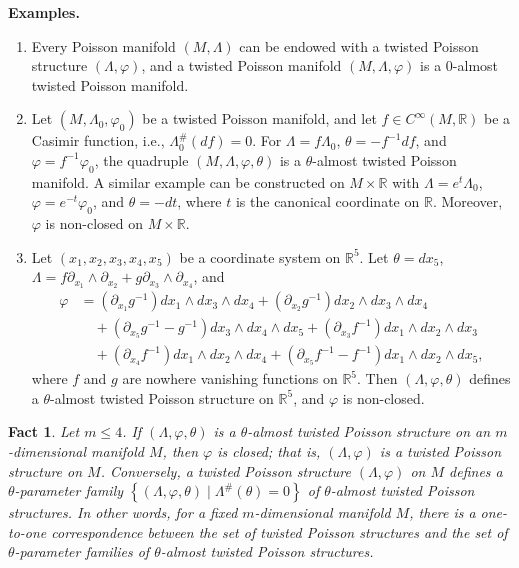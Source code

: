 \documentclass[a4paper,10pt]{article}
\numberwithin{equation}{section}
\theoremstyle{plain}
\newtheorem{fact}[theorem]{Fact}
\begin{document}
\noindent\textbf{Examples.}
\begin{enumerate}
	\item Every Poisson manifold $(M, \Lambda)$ can be endowed with a twisted Poisson structure $(\Lambda, \varphi)$, and a twisted Poisson manifold $(M, \Lambda, \varphi)$ is a $0$-almost twisted Poisson manifold.
	
	\item Let $(M, \Lambda_0, \varphi_0)$ be a twisted Poisson manifold, and let $f \in C^\infty(M, \mathbb{R})$ be a Casimir function, i.e., $\Lambda_0^{\#}(df) = 0$. For $\Lambda = f\Lambda_0$, $\theta = -f^{-1} df$, and $\varphi = f^{-1} \varphi_0$, the quadruple $(M, \Lambda, \varphi, \theta)$ is a $\theta$-almost twisted Poisson manifold. A similar example can be constructed on $M \times \mathbb{R}$ with $\Lambda = e^t \Lambda_0$, $\varphi = e^{-t} \varphi_0$, and $\theta = -dt$, where $t$ is the canonical coordinate on $\mathbb{R}$. Moreover, $\varphi$ is non-closed on $M \times \mathbb{R}$.
	
	\item \label{exem1.1.5} Let $(x_1, x_2, x_3, x_4, x_5)$ be a coordinate system on $\mathbb{R}^5$. Let $\theta = dx_5$, $\Lambda = f \partial_{x_1} \wedge \partial_{x_2} + g \partial_{x_3} \wedge \partial_{x_4}$, and
	\begin{align*}
		\varphi &= (\partial_{x_1} g^{-1}) dx_1 \wedge dx_3 \wedge dx_4 + (\partial_{x_2} g^{-1}) dx_2 \wedge dx_3 \wedge dx_4 \\
		&\quad + (\partial_{x_5} g^{-1} - g^{-1}) dx_3 \wedge dx_4 \wedge dx_5 + (\partial_{x_3} f^{-1}) dx_1 \wedge dx_2 \wedge dx_3 \\
		&\quad + (\partial_{x_4} f^{-1}) dx_1 \wedge dx_2 \wedge dx_4 + (\partial_{x_5} f^{-1} - f^{-1}) dx_1 \wedge dx_2 \wedge dx_5,
	\end{align*}
	where $f$ and $g$ are nowhere vanishing functions on $\mathbb{R}^5$. Then $(\Lambda, \varphi, \theta)$ defines a $\theta$-almost twisted Poisson structure on $\mathbb{R}^5$, and $\varphi$ is non-closed.
\end{enumerate}

		\begin{fact}Let $m \leq 4$. If $(\Lambda, \varphi, \theta)$ is a $\theta$-almost twisted Poisson structure on an $m$-dimensional manifold $M$, then $\varphi$ is closed; that is, $(\Lambda, \varphi)$ is a twisted Poisson structure on $M$. Conversely, a twisted Poisson structure $(\Lambda, \varphi)$ on $M$ defines a $\theta$-parameter family $\left\{(\Lambda, \varphi, \theta) \mid \Lambda^{\#}(\theta)=0\right\}$ of $\theta$-almost twisted Poisson structures. In other words, for a fixed $m$-dimensional manifold $M$, there is a one-to-one correspondence between the set of twisted Poisson structures and the set of $\theta$-parameter families of $\theta$-almost twisted Poisson structures.
		\end{fact}
\end{document}
